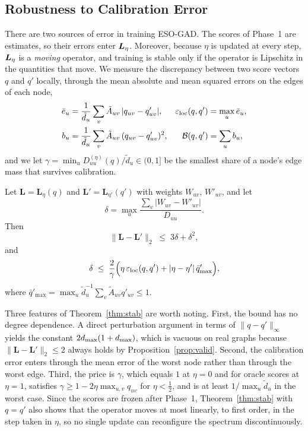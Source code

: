 \subsection{Robustness to Calibration Error}\label{sec:theory-stability}

There are two sources of error in training ESO-GAD.
The scores of Phase~1 are estimates, so their errors enter $\bm{L}_{\eta}$.
Moreover, because $\eta$ is updated at every step, $\bm{L}_{\eta}$ is a \emph{moving} operator, and training is stable only if the operator is Lipschitz in the quantities that move.
We measure the discrepancy between two score vectors $q$ and $q'$ locally, through the mean absolute and mean squared errors on the edges of each node,
\begin{align}
\bar e_u&=\frac{1}{\tilde d_u}\sum_v\tilde A_{uv}\,|q_{uv}-q'_{uv}|,&\varepsilon_{\mathrm{loc}}(q,q')&=\max_u\bar e_u,\notag\\
b_u&=\frac{1}{\tilde d_u}\sum_v\tilde A_{uv}\,(q_{uv}-q'_{uv})^2,&\mathcal B(q,q')&=\sum_ub_u,
\label{eq:localerrors}
\end{align}
and we let $\gamma=\min_uD^{(\eta)}_{uu}(q)/\tilde d_u\in(0,1]$ be the smallest share of a node's edge mass that survives calibration.

\begin{theorem}\label{thm:stab}
Let $\bm L=\bm L_\eta(q)$ and $\bm L'=\bm L_{\eta'}(q')$ with weights $W_{uv}$, $W'_{uv}$, and let
\[
\delta=\max_u\frac{\sum_v|W_{uv}-W'_{uv}|}{D_{uu}}.
\]
Then
\begin{equation}
\bigl\|\bm L-\bm L'\bigr\|_2\;\le\;3\delta+\delta^2,
\label{eq:stabjoint}
\end{equation}
and
\[
\delta\;\le\;\frac{2}{\gamma}\Bigl(\eta\,\varepsilon_{\mathrm{loc}}(q,q')+|\eta-\eta'|\,\bar q'_{\max}\Bigr),
\]
where $\bar q'_{\max}=\max_u\tilde d_u^{-1}\sum_v\tilde A_{uv}q'_{uv}\le1$.
\end{theorem}

Three features of Theorem~\ref{thm:stab} are worth noting.
First, the bound has no degree dependence.
A direct perturbation argument in terms of $\|q-q'\|_\infty$ yields the constant $2d_{\max}(1+d_{\max})$, which is vacuous on real graphs because $\|\bm L-\bm L'\|_2\le2$ always holds by Proposition~\ref{prop:valid}.
Second, the calibration error enters through the mean error of the worst node rather than through the worst edge.
Third, the price is $\gamma$, which equals $1$ at $\eta=0$ and for oracle scores at $\eta=1$, satisfies $\gamma\ge1-2\eta\max_{u,v}q_{uv}$ for $\eta<\tfrac12$, and is at least $1/\max_u\tilde d_u$ in the worst case.
Since the scores are frozen after Phase~1, Theorem~\ref{thm:stab} with $q=q'$ also shows that the operator moves at most linearly, to first order, in the step taken in $\eta$, so no single update can reconfigure the spectrum discontinuously.

